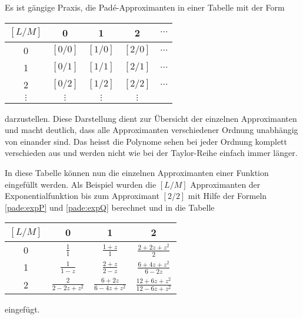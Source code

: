 Es ist gängige Praxis, die Padé-Approximanten in einer Tabelle mit der Form
\begin{center}
	\begin{tabular}{c| c c c c}
		
		$[L/M]$ 	& 0 		& 1 		& 2 		& $\cdots$ \\
		\hline
		0 		& $[0/0]$ 	& $[1/0]$ 	& $[2/0]$ 	& $\dots$ \\
		1 		& $[0/1]$ 	& $[1/1]$ 	& $[2/1]$ 	& $\dots$ \\
		2 		& $[0/2]$ 	& $[1/2]$ 	& $[2/2]$ 	& $\dots$ \\
		$\vdots$ 	& $\vdots$ 	& $\vdots$  	& $\vdots$  	&  \\
	\end{tabular}
\end{center}
darzustellen.
Diese Darstellung dient zur Übersicht der einzelnen Approximanten und macht deutlich, dass alle Approximanten verschiedener Ordnung unabhängig von einander sind. 
Das heisst die Polynome sehen bei jeder Ordnung komplett verschieden aus und werden nicht wie bei der Taylor-Reihe einfach immer länger. 


In diese Tabelle können nun die einzelnen Approximanten einer Funktion eingefüllt werden.
Als Beispiel wurden die $[L/M]$ Approximanten der Exponentialfunktion
bis zum Approximant $[2/2]$
mit Hilfe der Formeln \ref{pade:expP} und \ref{pade:expQ} berechnet und
in die Tabelle
\begin{center}
\renewcommand\arraystretch{2.2}
	\begin{tabular}{c| c c c }
		$[L/M]$ 	& 0 		& 1 		& 2 	 \\
		\hline
		0 		&  $\displaystyle\frac{1}{1}$ 	& $\displaystyle\frac{1+z}{1}$ 	& $\displaystyle\frac{2+2 z+z^{2}}{2}$ \\
		1 		& $\displaystyle \frac{1}{1-z}$ 	& $\displaystyle\frac{2+z}{2-z}$ 	& $\displaystyle\frac{6+4 z+z^{2}}{6-2 z}$ 	 \\
		2 		& $\displaystyle\frac{2}{2-2 z+z^{2}} $ 	& $\displaystyle\frac{6+2 z}{6-4 z+z^{2}}$ 	& $\displaystyle\frac{12+6 z+z^{2}}{12-6 z+z^{2}}$ 	 \\
	\end{tabular}
\end{center}
eingefügt.













